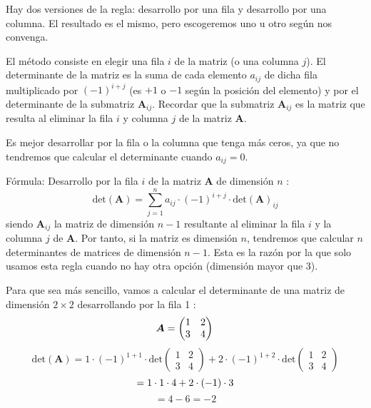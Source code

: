 \begin{}
Hay dos versiones de la regla: desarrollo por una fila y desarrollo por una columna. El resultado es el mismo, pero escogeremos uno u otro según nos convenga.

El método  consiste en elegir una fila $i$ de la matriz (o una columna $j$).
El determinante de la matriz es la suma de cada elemento $a_{ij}$ de dicha fila multiplicado por $(-1)^{i+j}$ (es $+1$ o $-1$ según la posición del elemento) y por el determinante de la submatriz $\boldsymbol{A}_{ij}$.
Recordar que la submatriz $\boldsymbol{A}_{ij}$ es la matriz que resulta al eliminar la fila $i$ y columna $j$ de la matriz $\boldsymbol{A}$.
\begin{remark}
  Es mejor desarrollar por la fila o la columna que tenga más ceros, ya que no tendremos que calcular el determinante cuando $a_{ij} = 0$.  
\end{remark}

Fórmula: Desarrollo por la fila $i$ de la matriz $\boldsymbol{A}$ de dimensión $n$ :
$$
\text{det}(\boldsymbol{A})=\sum_{j=1}^n a_{i j} \cdot(-1)^{i+j} \cdot \text{det}(\boldsymbol{A})_{i j}
$$
siendo $\boldsymbol{A}_{i j}$ la matriz de dimensión $n-1$ resultante al eliminar la fila $i$ y la columna $j$ de $\boldsymbol{A}$.
Por tanto, si la matriz es dimensión $n$, tendremos que calcular $n$ determinantes de matrices de dimensión $n-1$. Esta es la razón por la que solo usamos esta regla cuando no hay otra opción (dimensión mayor que 3).



\begin{example}
Para que sea más sencillo, vamos a calcular el determinante de una matriz de dimensión $2 \times 2$ desarrollando por la fila 1 :
\[
 \boldsymbol{A}=\begin{pmatrix}
1 & 2 \\
3 & 4
\end{pmatrix}\\\]
\[
\text{det}(\boldsymbol{A}) =1 \cdot(-1)^{1+1} \cdot\text{det}\begin{pmatrix}   
1 & 2 \\
3 & 4
 \end{pmatrix} 
 +2 \cdot(-1)^{1+2} \cdot \text{det}\begin{pmatrix}
1 & 2 \\
3 & 4
\end{pmatrix} \]\[
 =1 \cdot 1 \cdot4
+2 \cdot(-1) \cdot 3\\\]\[
 =4-6=-2\]
\end{example}


\end{}
